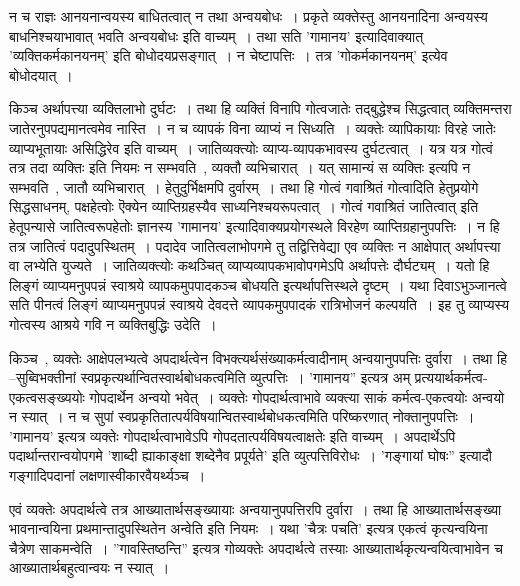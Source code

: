 				न च राज्ञः आनयनान्वयस्य बाधितत्वात् न तथा अन्वयबोधः~।  प्रकृते व्यक्तेस्तु आनयनादिना अन्वयस्य बाधनिश्चयाभावात्  भवति अन्वयबोधः  इति वाच्यम्~।  तथा सति ’गामानय’ इत्यादिवाक्यात् ’व्यक्तिकर्मकानयनम्’ इति बोधोदयप्रसङ्गात्~।  न चेष्टापत्तिः~।  तत्र ’गोकर्मकानयनम्’ इत्येव बोधोदयात्~। 

				किञ्च अर्थापत्त्या व्यक्तिलाभो दुर्घटः~।  तथा हि व्यक्तिं विनापि गोत्वजातेः तद्बुद्धेश्च सिद्धत्वात् व्यक्तिमन्तरा जातेरनुपपद्यमानत्वमेव नास्ति~।  न च व्यापकं विना व्याप्यं न सिध्यति~।  व्यक्तेः व्यापिकायाः विरहे जातेः व्याप्यभूतायाः असिद्धिरेव  इति वाच्यम्~।  जातिव्यक्त्योः  व्याप्य-व्यापकभावस्य दुर्घटत्वात्~।  यत्र यत्र गोत्वं तत्र तदा व्यक्तिः इति नियमः न सम्भवति~, व्यक्तौ व्यभिचारात्~।  यत् सामान्यं स व्यक्तिः इत्यपि न सम्भवति~, जातौ व्यभिचारात्~।  हेतुदुर्भिक्षमपि दुर्वारम्~।  तथा हि गोत्वं गवाश्रितं गोत्वादिति हेतुप्रयोगे सिद्धसाधनम्, पक्षहेत्वोः ऎक्येन  व्याप्तिग्रहस्यैव  साध्यनिश्चयरूपत्वात्~।  गोत्वं गवाश्रितं जातित्वात् इति हेतूपन्यासे  जातित्वरूपहेतोः ज्ञानस्य ’गामानय’  इत्यादिवाक्यप्रयोगस्थले विरहेण व्याप्तिग्रहानुपपत्तिः~।  न हि तत्र जातित्वं पदादुपस्थितम्~।  पदादेव जातित्वलाभोपगमे  तु तद्वित्तिवेद्या एव व्यक्तिः न आक्षेपात् अर्थापत्त्या वा लभ्येति युज्यते~।  जातिव्यक्त्योः कथञ्चित् व्याप्यव्यापकभावोपगमेऽपि अर्थापत्तेः दौर्घट्यम्~।  यतो हि लिङ्गं व्याप्यमनुपपन्नं स्वाश्रये व्यापकमुपपादकञ्च बोधयति इत्यर्थापत्तिस्थले दृष्टम्~।  यथा दिवाऽभुञ्जानत्वे सति पीनत्वं लिङ्गं व्याप्यमनुपपन्नं स्वाश्रये देवदत्ते व्यापकमुपपादकं रात्रिभोजनं कल्पयति~।  इह तु व्याप्यस्य गोत्वस्य आश्रये गवि न व्यक्तिबुद्धिः उदेति~। 
	
				किञ्च~, व्यक्तेः आक्षेपलभ्यत्वे अपदार्थत्वेन विभक्त्यर्थसंख्याकर्मत्वादीनाम् अन्वयानुपपत्तिः दुर्वारा~।  तथा हि –सुब्विभक्तीनां स्वप्रकृत्यर्थान्वितस्वार्थबोधकत्वमिति व्युत्पत्तिः~।  ’गामानय” इत्यत्र अम् प्रत्ययार्थकर्मत्व-एकत्वसङ्ख्ययोः गोपदार्थेन अन्वयो भवेत्~।  व्यक्तेः गोपदार्थत्वाभावे व्यक्त्या साकं कर्मत्व-एकत्वयोः अन्वयो न स्यात्~।  न च सुपां स्वप्रकृतितात्पर्यविषयान्वितस्वार्थबोधकत्वमिति परिष्करणात् नोक्तानुपपत्तिः~।  ’गामानय’ इत्यत्र व्यक्तेः गोपदार्थत्वाभावेऽपि गोपदतात्पर्यविषयत्वाक्षतेः इति वाच्यम्~। अपदार्थेऽपि पदार्थान्तरान्वयोपगमे ’शाब्दी ह्याकाङ्क्षा शब्देनैव प्रपूर्यते’ इति व्युत्पत्तिविरोधः~।  ’गङ्गायां घोषः” इत्यादौ गङ्गादिपदानां लक्षणास्वीकारवैयर्थ्यञ्च~। 

				एवं व्यक्तेः अपदार्थत्वे तत्र आख्यातार्थसङ्ख्यायाः अन्वयानुपपत्तिरपि दुर्वारा~।  तथा हि आख्यातार्थसङ्ख्या भावनान्वयिना प्रथमान्तादुपस्थितेन अन्वेति इति नियमः~।  यथा ’चैत्रः पचति’ इत्यत्र एकत्वं कृत्यन्वयिना चैत्रेण साकमन्वेति~।  ”गावस्तिष्ठन्ति” इत्यत्र गोव्यक्तेः अपदार्थत्वे तस्याः आख्यातार्थकृत्यन्वयित्वाभावेन च आख्यातार्थबहुत्वान्वयः न स्यात्~। 

